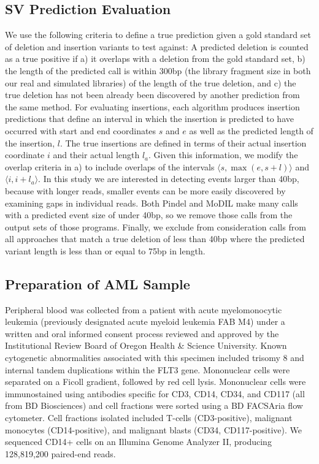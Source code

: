 \documentclass[11pt]{article}
\begin{document}
\subsection{SV Prediction Evaluation}
We use the following criteria to define a true prediction given a gold standard set of deletion and insertion variants to test against: A predicted deletion is counted as a true positive if a) it overlaps with a deletion from the gold standard set, b) the length of the predicted call is within 300bp (the library fragment size in both our real and simulated libraries) of the length of the true deletion, and c) the true deletion has not been already been discovered by another prediction from the same method. For evaluating insertions, each algorithm produces insertion predictions that define an interval in which the insertion is predicted to have occurred with start and end coordinates $s$ and $e$ as well as the predicted length of the insertion, $l$. The true insertions are defined in terms of their actual insertion coordinate $i$ and their actual length $l_a$. Given this information, we modify the overlap criteria in a) to include overlaps of the intervals $\langle s,\max{\left(e,s+l\right)} \rangle$ and $\langle i,i+l_a \rangle$. In this study we are interested in detecting events larger than 40bp, because with longer reads, smaller events can be more easily discovered by examining gaps in individual reads. Both Pindel and MoDIL make many calls with a predicted event size of under 40bp, so we remove those calls from the output sets of those programs. Finally, we exclude from consideration calls from all approaches that match a true deletion of less than 40bp where the predicted variant length is less than or equal to 75bp in length.

\subsection{Preparation of AML Sample}

Peripheral blood was collected from a patient with acute myelomonocytic leukemia (previously designated acute myeloid leukemia FAB M4) under a written and oral informed consent process reviewed and approved by the Institutional Review Board of Oregon Health \& Science University. Known cytogenetic abnormalities associated with this specimen included trisomy 8 and internal tandem duplications within the FLT3 gene. Mononuclear cells were separated on a Ficoll gradient, followed by red cell lysis. Mononuclear cells were immunostained using antibodies specific for CD3, CD14, CD34, and CD117 (all from BD Biosciences) and cell fractions were sorted using a BD FACSAria flow cytometer. Cell fractions isolated included T-cells (CD3-positive), malignant monocytes (CD14-positive), and malignant blasts (CD34, CD117-positive). We sequenced CD14+ cells on an Illumina Genome Analyzer II, producing 128,819,200 paired-end reads.
\end{document}
